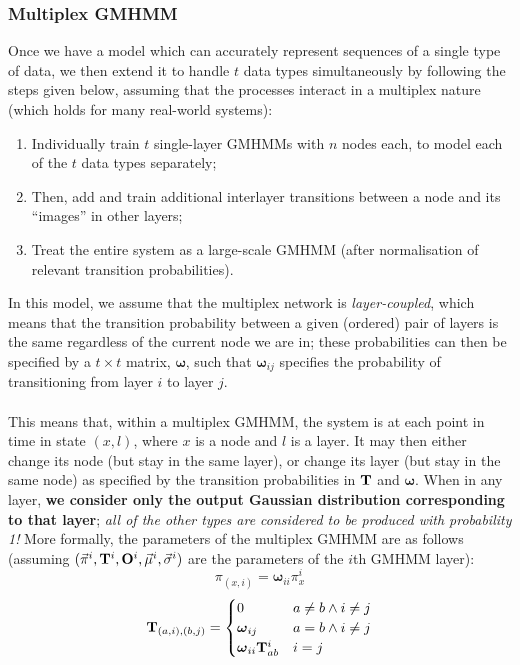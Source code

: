 \documentclass[12pt]{article}
\begin{document}
	\subsubsection{Multiplex GMHMM}
	
	Once we have a model which can accurately represent sequences of a single type of data, we then extend it to handle $t$ data types simultaneously by following the steps given below, assuming that the processes interact in a multiplex nature (which holds for many real-world systems):
	\begin{enumerate}
		\item Individually train $t$ single-layer GMHMMs with $n$ nodes each, to model each of the $t$ data types separately;
		\item Then, add and train additional interlayer transitions between a node and its ``images'' in other layers;
		\item Treat the entire system as a large-scale GMHMM (after normalisation of relevant transition probabilities).
	\end{enumerate}
	In this model, we assume that the multiplex network is \emph{layer-coupled}, which means that the transition probability between a given (ordered) pair of layers is the same regardless of the current node we are in; these probabilities can then be specified by a $t \times t$ matrix, $\boldsymbol\omega$, such that ${\boldsymbol\omega}_{ij}$ specifies the probability of transitioning from layer $i$ to layer $j$.\\ \\
	This means that, within a multiplex GMHMM, the system is at each point in time in state $(x, l)$, where $x$ is a node and $l$ is a layer. It may then either change its node (but stay in the same layer), or change its layer (but stay in the same node) as specified by the transition probabilities in $\bf T$ and $\boldsymbol\omega$. When in any layer, {\bf we consider only the output Gaussian distribution corresponding to that layer}; {\it all of the other types are considered to be produced with probability 1!} More formally, the parameters of the multiplex GMHMM are as follows (assuming $(\vec{\pi}^i, {\bf T}^i, {\bf O}^i, \vec{\mu}^i, \vec{\sigma}^i)$ are the parameters of the $i$th GMHMM layer):
	\begin{equation}
	{\pi}_{(x, i)} = \boldsymbol\omega_{ii}\pi_x^i
\end{equation}
\begin{equation}
	{\bf T}_{(a, i), (b, j)} = \begin{cases}
 	0 & a\neq b \wedge i\neq j\\
 	\boldsymbol\omega_{ij} & a=b\wedge i\neq j\\
 	\boldsymbol\omega_{ii}{\bf T}_{ab}^{i} & i=j\\
 \end{cases}\end{equation}
\end{document}
